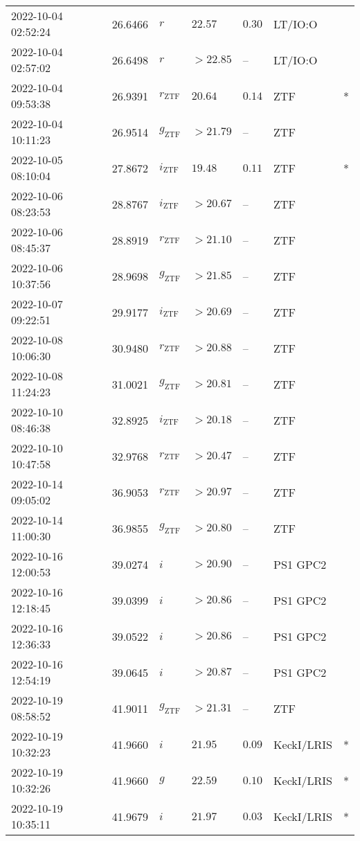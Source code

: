 \documentclass{nature_plusfigure}
\begin{document}
\begin{supplement}
\begin{center}
\begin{longtable}{lllllll}
2022-10-04 02:52:24 & 26.6466 & $r$ & $22.57$ & $0.30$ & LT/IO:O &  \\ 
2022-10-04 02:57:02 & 26.6498 & $r$ & $>22.85$ & -- & LT/IO:O &  \\ 
2022-10-04 09:53:38 & 26.9391 & ${r}_\mathrm{ZTF}$ & $20.64$ & $0.14$ & ZTF & * \\ 
2022-10-04 10:11:23 & 26.9514 & ${g}_\mathrm{ZTF}$ & $>21.79$ & -- & ZTF &  \\ 
2022-10-05 08:10:04 & 27.8672 & ${i}_\mathrm{ZTF}$ & $19.48$ & $0.11$ & ZTF & * \\ 
2022-10-06 08:23:53 & 28.8767 & ${i}_\mathrm{ZTF}$ & $>20.67$ & -- & ZTF &  \\ 
2022-10-06 08:45:37 & 28.8919 & ${r}_\mathrm{ZTF}$ & $>21.10$ & -- & ZTF &  \\ 
2022-10-06 10:37:56 & 28.9698 & ${g}_\mathrm{ZTF}$ & $>21.85$ & -- & ZTF &  \\ 
2022-10-07 09:22:51 & 29.9177 & ${i}_\mathrm{ZTF}$ & $>20.69$ & -- & ZTF &  \\ 
2022-10-08 10:06:30 & 30.9480 & ${r}_\mathrm{ZTF}$ & $>20.88$ & -- & ZTF &  \\ 
2022-10-08 11:24:23 & 31.0021 & ${g}_\mathrm{ZTF}$ & $>20.81$ & -- & ZTF &  \\ 
2022-10-10 08:46:38 & 32.8925 & ${i}_\mathrm{ZTF}$ & $>20.18$ & -- & ZTF &  \\ 
2022-10-10 10:47:58 & 32.9768 & ${r}_\mathrm{ZTF}$ & $>20.47$ & -- & ZTF &  \\ 
2022-10-14 09:05:02 & 36.9053 & ${r}_\mathrm{ZTF}$ & $>20.97$ & -- & ZTF &  \\ 
2022-10-14 11:00:30 & 36.9855 & ${g}_\mathrm{ZTF}$ & $>20.80$ & -- & ZTF &  \\ 
2022-10-16 12:00:53 & 39.0274 & $i$ & $>20.90$ & -- & PS1 GPC2 &  \\ 
2022-10-16 12:18:45 & 39.0399 & $i$ & $>20.86$ & -- & PS1 GPC2 &  \\ 
2022-10-16 12:36:33 & 39.0522 & $i$ & $>20.86$ & -- & PS1 GPC2 &  \\ 
2022-10-16 12:54:19 & 39.0645 & $i$ & $>20.87$ & -- & PS1 GPC2 &  \\ 
2022-10-19 08:58:52 & 41.9011 & ${g}_\mathrm{ZTF}$ & $>21.31$ & -- & ZTF &  \\ 
2022-10-19 10:32:23 & 41.9660 & $i$ & $21.95$ & $0.09$ & KeckI/LRIS & * \\ 
2022-10-19 10:32:26 & 41.9660 & $g$ & $22.59$ & $0.10$ & KeckI/LRIS & * \\ 
2022-10-19 10:35:11 & 41.9679 & $i$ & $21.97$ & $0.03$ & KeckI/LRIS & * \\ 

\end{longtable}
\end{center}
\end{supplement}
\end{document}
